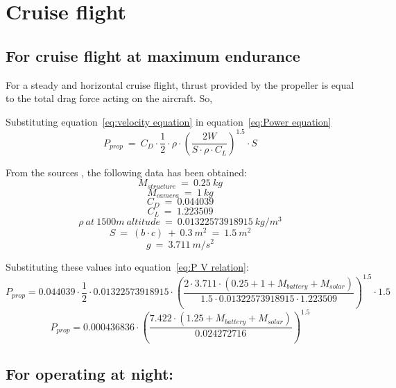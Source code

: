 
\chapter{Cruise flight}
\label{chap: Cruise Flight}

\section{For cruise flight at maximum endurance}

\p For a steady and horizontal cruise flight, thrust provided by the propeller is equal to the total drag force acting on the aircraft. So,


Substituting equation~\ref{eq:velocity equation} in equation~\ref{eq:Power equation}
\[ P_{prop} \ = \  C_D \cdot \frac{1}{2} \cdot \rho \cdot \left(\frac{2W}{S \cdot \rho \cdot C_L }\right)^{1.5} \cdot S \]


From the sources \cite{RE} \cite{Manual} \cite{enwiki:1186424503}, the following data has been obtained:
\[ M_{structure} \ = \ 0.25 \ kg \] \[ M_{camera} \ = \ 1 \ kg \]
\[ C_D \ = \ 0.044039 \] \[ C_L \ = \ 1.223509 \]
\[ \rho \ at \ 1500m \ altitude \ = \ 0.01322573918915 \ kg/m^3 \]
\[S \ = \ ( b \cdot c ) \ + \ 0.3 \ m^2 \ = \ 1.5 \ m^2\]
\[g \ = \ 3.711 \ m/s^2 \]

Substituting these values into equation~\ref{eq:P V relation}:
\[ P_{prop} = 0.044039 \cdot \frac{1}{2} \cdot 0.01322573918915 \cdot \left(\frac{2 \cdot 3.711 \cdot (0.25 + 1 + M_{battery} + M_{solar})}{1.5 \cdot 0.01322573918915 \cdot 1.223509} \right)^{1.5} \cdot 1.5 \]
\[ P_{prop} = 0.000436836 \cdot \left(\frac{7.422 \cdot (1.25 + M_{battery} + M_{solar})}{ 0.024272716 } \right)^{1.5} \]

\section{For operating at night:}

